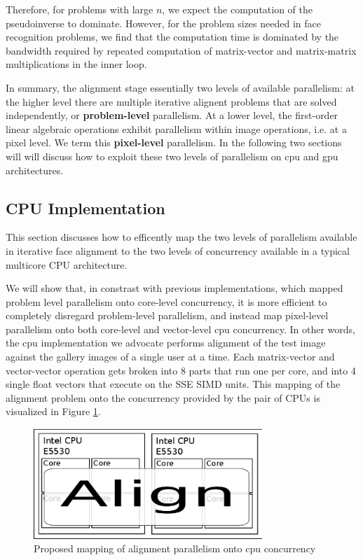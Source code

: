 \documentclass[10pt,twocolumn,letterpaper]{article}
\begin{document}
Therefore, for problems with large $n$, we expect the computation of the
pseudoinverse to dominate.  However, for the problem sizes needed in face
recognition problems, we find that the computation time is dominated by the
bandwidth required by repeated computation of matrix-vector and matrix-matrix
multiplications in the inner loop.

In summary, the alignment stage essentially two levels of available
parallelism: at the higher level there are multiple iterative alignent problems
that are solved independently, or {\bf problem-level} parallelism.  At a lower
level, the first-order linear algebraic operations exhibit parallelism within
image operations, i.e. at a pixel level.  We term this {\bf pixel-level}
parallelism.  In the following two sections will will discuss how to
exploit these two levels of parallelism on cpu and gpu architectures.

\subsection{CPU Implementation} 
\label{sec:alignment_implementation_cpu}
This section discusses how to efficently map the two levels of parallelism
available in iterative face alignment to the two levels of concurrency
available in a typical multicore CPU architecture.

We will show that, in constrast with previous implementations, which mapped
problem level parallelism onto core-level concurrency, it is more efficient to
completely disregard problem-level parallelism, and instead map pixel-level
parallelism onto both core-level and vector-level cpu concurrency.  In other
words, the cpu implementation we advocate performs alignment of the test image
against the gallery images of a single user at a time.  Each matrix-vector and
vector-vector operation gets broken into 8 parts that run one per core, and
into 4 single float vectors that execute on the SSE SIMD units.
This mapping of the alignment problem onto the concurrency provided by the pair
of CPUs is visualized in Figure \ref{fig:alignment_mapping_cpu}.
\begin{figure}
\centering
\includegraphics[width=3.4in]{figures/alignment_mapping_cpu}
\caption{Proposed mapping of alignment parallelism onto cpu concurrency}
\label{fig:alignment_mapping_cpu}
\end{figure}
\end{document}
